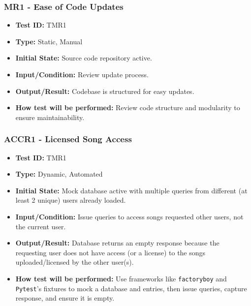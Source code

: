\documentclass[12pt, titlepage]{article}
\begin{document}
\subsubsection{MR1 - Ease of Code Updates}
\begin{itemize}
    \item \textbf{Test ID:} TMR1
    \item \textbf{Type:} Static, Manual
    \item \textbf{Initial State:} Source code repository active.
    \item \textbf{Input/Condition:} Review update process.
    \item \textbf{Output/Result:} Codebase is structured for easy updates.
    \item \textbf{How test will be performed:} Review code structure and modularity to ensure maintainability.
\end{itemize}

\subsubsection{ACCR1 - Licensed Song Access}
\begin{itemize}
    \item \textbf{Test ID:} TMR1
    \item \textbf{Type:} Dynamic, Automated
    \item \textbf{Initial State:} Mock database active with multiple queries from different (at least 2 unique) users already loaded.
    \item \textbf{Input/Condition:} Issue queries to access songs requested other users, not the current user.
    \item \textbf{Output/Result:} Database returns an empty response because the requesting user does not have access (or a license) to the songs uploaded/licensed by the other user(s).
    \item \textbf{How test will be performed:} Use frameworks like \texttt{factoryboy} and \texttt{Pytest}'s fixtures to mock a database and entries, then issue queries, capture response, and ensure it is empty.
\end{itemize}
\end{document}
